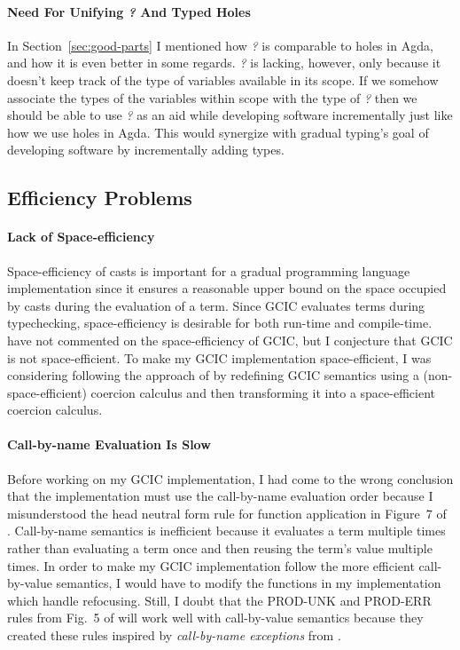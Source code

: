 \documentclass{article}
\theoremstyle{definition}
\newcommand{\Gcode}[1]{{\color{OliveGreen}\textit{#1}}}
\begin{document}
\paragraph{Need For Unifying \Gcode{?} And Typed Holes}
In Section~\ref{sec:good-parts} I mentioned how \Gcode{?} is comparable to holes
in Agda, and how it is even better in some regards. \Gcode{?} is lacking,
however, only because it doesn't keep track of the type of variables available
in its scope. If we somehow associate the types of the variables within scope
with the type of \Gcode{?} then we should be able to use \Gcode{?} as an aid
while developing software incrementally just like how we use holes in Agda. This
would synergize with gradual typing's goal of developing software by
incrementally adding types.

\subsection{Efficiency Problems}\label{sec:efficiency}

\paragraph{Lack of Space-efficiency}
Space-efficiency of casts is important for a gradual programming language
implementation since it ensures a reasonable upper bound on the space occupied
by casts during the evaluation of a term\cite{herman_space-efficient_2010}.
Since GCIC evaluates terms during typechecking, space-efficiency is desirable
for both run-time and compile-time. \citet{lennon-bertrand_gradualizing_2022}
have not commented on the space-efficiency of GCIC, but I conjecture that GCIC
is not space-efficient. To make my GCIC implementation space-efficient, I was
considering following the approach of \citet{siek_blame_2021} by redefining GCIC
semantics using a (non-space-efficient) coercion calculus and then transforming
it into a space-efficient coercion calculus.

\paragraph{Call-by-name Evaluation Is Slow}
Before working on my GCIC implementation, I had come to the wrong conclusion
that the implementation must use the call-by-name evaluation order because I
misunderstood the head neutral form rule for function application in Figure~7 of
\citet{lennon-bertrand_gradualizing_2022}. Call-by-name semantics is inefficient
because it evaluates a term multiple times rather than evaluating a term once
and then reusing the term's value multiple times. In order to make my GCIC
implementation follow the more efficient call-by-value semantics, I would have
to modify the functions in my implementation which handle refocusing. Still, I
doubt that the PROD-UNK and PROD-ERR rules from Fig.~5 of
\citet{lennon-bertrand_gradualizing_2022} will work well with call-by-value
semantics because they created these rules inspired by \textit{call-by-name
  exceptions} from \citet{pedrot_failure_2018}.
\end{document}
